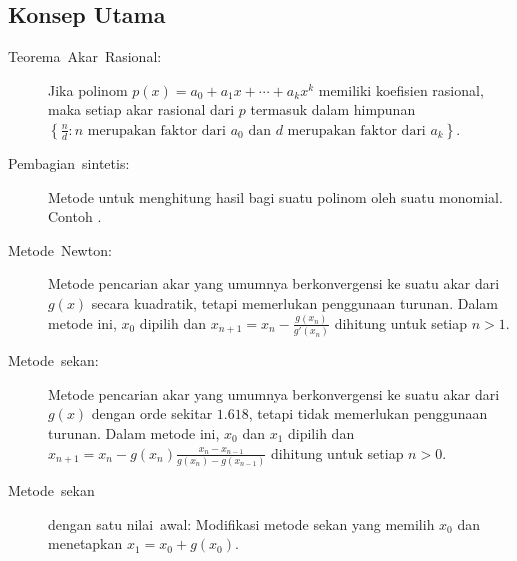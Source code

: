 \subsection{Konsep Utama}
\begin{description}
\item [{Teorema~Akar~Rasional:}]  Jika
polinom $p(x)=a_{0}+a_{1}x+\cdots+a_{k}x^{k}$ memiliki koefisien
rasional, maka setiap akar rasional dari $p$ termasuk dalam himpunan
$\left\{ \frac{n}{d}:n\mbox{ merupakan faktor dari }a_{0}\mbox{ dan }d\mbox{ merupakan faktor dari }a_{k}\right\} $.
\item [{Pembagian~sintetis:}]  Metode untuk
menghitung hasil bagi suatu polinom oleh suatu monomial. Contoh .
\item [{Metode~Newton:}]  Metode pencarian akar
yang umumnya berkonvergensi ke suatu akar dari $g(x)$ secara kuadratik,
tetapi memerlukan penggunaan turunan. Dalam metode ini, $x_{0}$ dipilih
dan $x_{n+1}=x_{n}-\frac{g(x_{n})}{g'(x_{n})}$ dihitung untuk setiap
$n>1$.
\item [{Metode~sekan:}]  Metode pencarian akar yang
umumnya berkonvergensi ke suatu akar dari $g(x)$ dengan orde sekitar
$1.618$, tetapi tidak memerlukan penggunaan turunan. Dalam metode
ini, $x_{0}$ dan $x_{1}$ dipilih dan $x_{n+1}=x_{n}-g(x_{n})\frac{x_{n}-x_{n-1}}{g(x_{n})-g(x_{n-1})}$
dihitung untuk setiap $n>0$.
\item [{Metode~sekan}] dengan satu nilai~awal: 
Modifikasi metode sekan yang memilih $x_{0}$ dan menetapkan $x_{1}=x_{0}+g(x_{0})$.
\end{description}
\startexercises

